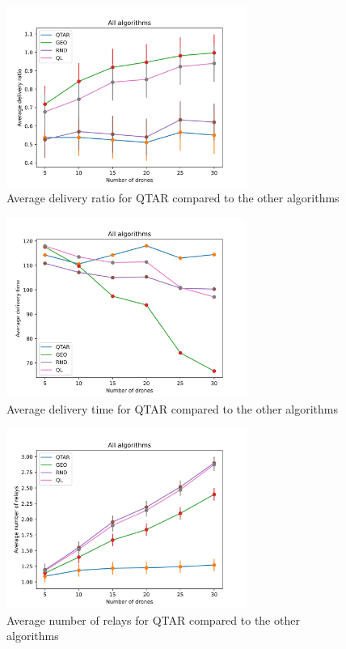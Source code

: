 \begin{figure}[h]
    \centering
    \includegraphics[width=0.7\textwidth]{../plots/average_delivery_ratio.png}
    \caption{Average delivery ratio for QTAR compared to the other algorithms}
\end{figure}

\begin{figure}[h]
    \centering
    \includegraphics[width=0.7\textwidth]{../plots/average_delivery_time.png}
    \caption{Average delivery time for QTAR compared to the other algorithms}
\end{figure}

\begin{figure}[h]
    \centering
    \includegraphics[width=0.7\textwidth]{../plots/average_number_of_relays.png}
    \caption{Average number of relays for QTAR compared to the other algorithms}
\end{figure}

